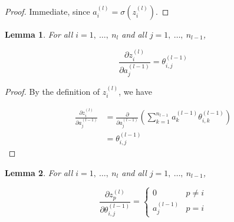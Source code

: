 \documentclass{article}[11pt]
\newtheorem{lemma}{Lemma}
\begin{document}
        \begin{proof}
        
            Immediate, since $a^{(l)}_i = \sigma(z^{(l)}_i)$.
        
        \end{proof}
    
        
        
        \begin{lemma}
            
            For all $i = 1, \ \ldots, \ n_l$ and all $j = 1, \ \ldots, \ n_{l-1}$,
            
            $$
            \frac{\partial z^{(l)}_i}{\partial a^{(l-1)}_j} = \theta^{(l-1)}_{i,j}
            $$
            
        \end{lemma}
        
        \begin{proof}
            
            By the definition of $z^{(l)}_i$, we have
            
            $$ \begin{aligned}
            \frac{\partial z^{(l)}_i}{\partial a^{(l-1)}_j}
            &= \frac{\partial}{\partial a^{(l-1)}_j} \left( \sum_{k = 1}^{n_{l-1}} a^{(l-1)}_k \theta^{(l-1)}_{i,k} \right) \\
            &= \theta^{(l-1)}_{i,j}
            \end{aligned} $$
            
        \end{proof}
        
        
        
        
        \begin{lemma}
            
            For all $i = 1, \ \ldots, \ n_l$ and all $j = 1, \ \ldots, \ n_{l-1}$,
            
            $$
            \frac{\partial z^{(l)}_p}{\partial \theta^{(l-1)}_{i,j}} = \begin{cases}
                0 & p \neq i \\
                a^{(l-1)}_j & p = i
            \end{cases}
            $$
            
        \end{lemma}
        
\end{document}
